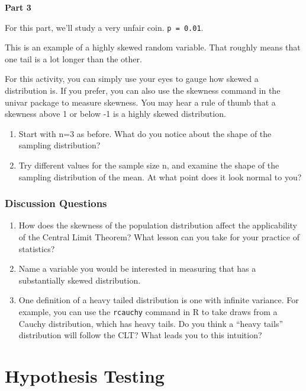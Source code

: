 \documentclass[
]{book}
\theoremstyle{definition}
\theoremstyle{definition}
\theoremstyle{definition}
\theoremstyle{definition}
\theoremstyle{remark}
\begin{document}
\textbf{Part 3}

For this part, we'll study a very unfair coin. \texttt{p\ =\ 0.01}.

This is an example of a highly skewed random variable. That roughly means that one tail is a lot longer than the other.

For this activity, you can simply use your eyes to gauge how skewed a distribution is. If you prefer, you can also use the skewness command in the univar package to measure skewness. You may hear a rule of thumb that a skewness above 1 or below -1 is a highly skewed distribution.

\begin{enumerate}
\def\labelenumi{\arabic{enumi}.}
\setcounter{enumi}{5}
\item
  Start with n=3 as before. What do you notice about the shape of the sampling distribution?
\item
  Try different values for the sample size n, and examine the shape of the sampling distribution of the mean. At what point does it look normal to you?
\end{enumerate}

\hypertarget{discussion-questions}{%
\subsection{Discussion Questions}\label{discussion-questions}}

\begin{enumerate}
\def\labelenumi{\arabic{enumi}.}
\item
  How does the skewness of the population distribution affect the applicability of the Central Limit Theorem? What lesson can you take for your practice of statistics?
\item
  Name a variable you would be interested in measuring that has a substantially skewed distribution.
\item
  One definition of a heavy tailed distribution is one with infinite variance. For example, you can use the \texttt{rcauchy} command in R to take draws from a Cauchy distribution, which has heavy tails. Do you think a ``heavy tails'' distribution will follow the CLT? What leads you to this intuition?
\end{enumerate}

\hypertarget{hypothesis-testing}{%
\chapter{Hypothesis Testing}\label{hypothesis-testing}}
\end{document}
